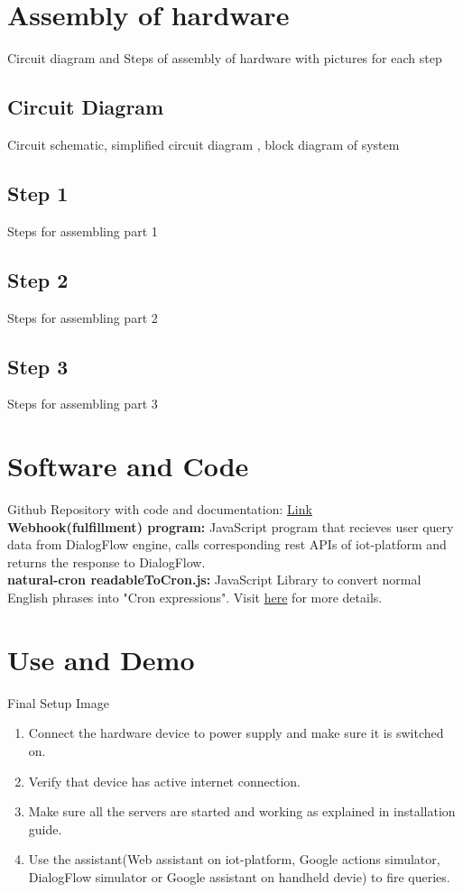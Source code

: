 \documentclass[a4paper,12pt,oneside]{book}
\begin{document}
\section{Assembly of hardware}
Circuit diagram and Steps of assembly of hardware with pictures for each step
\subsection*{Circuit Diagram}
Circuit schematic, simplified circuit diagram , block diagram of system
\subsection*{Step 1}
Steps for assembling part 1
\subsection*{Step 2}
Steps for assembling part 2
\subsection*{Step 3}
Steps for assembling part 3



\section{Software and Code}
Github Repository with code and documentation: \href{https://github.com/eYSIP-2018/IFTTT-and-NLP}{Link}
\newline\\
\textbf{Webhook(fulfillment) program:}
\newline JavaScript program that recieves user query data from DialogFlow engine, calls corresponding rest APIs of iot-platform and returns the response to DialogFlow.
\newline\\
\textbf{natural-cron readableToCron.js:}
\newline JavaScript Library to convert normal English phrases into "Cron expressions". Visit \href{https://github.com/darkeyedevelopers/natural-cron.js}{here} for more details.

\section{Use and Demo}
Final Setup Image

\begin{enumerate}
\item Connect the hardware device to power supply and make sure it is switched on.
\item Verify that device has active internet connection.
\item Make sure all the servers are started and working as explained in installation guide.
\item Use the assistant(Web assistant on iot-platform, Google actions simulator, DialogFlow simulator or Google assistant on handheld devie) to fire queries.
\end{enumerate}
\end{document}
